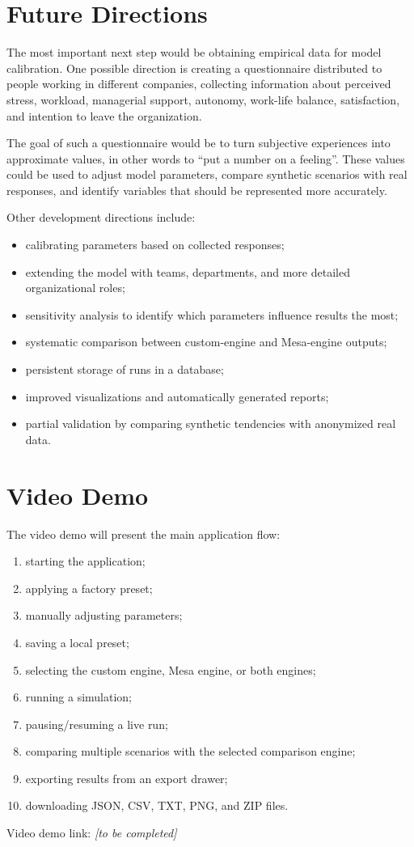 \documentclass[12pt,a4paper]{article}
\begin{document}
\section{Future Directions}

The most important next step would be obtaining empirical data for model calibration. One possible direction is creating a questionnaire distributed to people working in different companies, collecting information about perceived stress, workload, managerial support, autonomy, work-life balance, satisfaction, and intention to leave the organization.

The goal of such a questionnaire would be to turn subjective experiences into approximate values, in other words to ``put a number on a feeling''. These values could be used to adjust model parameters, compare synthetic scenarios with real responses, and identify variables that should be represented more accurately.

Other development directions include:

\begin{itemize}
    \item calibrating parameters based on collected responses;
    \item extending the model with teams, departments, and more detailed organizational roles;
    \item sensitivity analysis to identify which parameters influence results the most;
    \item systematic comparison between custom-engine and Mesa-engine outputs;
    \item persistent storage of runs in a database;
    \item improved visualizations and automatically generated reports;
    \item partial validation by comparing synthetic tendencies with anonymized real data.
\end{itemize}

\section{Video Demo}

The video demo will present the main application flow:

\begin{enumerate}
    \item starting the application;
    \item applying a factory preset;
    \item manually adjusting parameters;
    \item saving a local preset;
    \item selecting the custom engine, Mesa engine, or both engines;
    \item running a simulation;
    \item pausing/resuming a live run;
    \item comparing multiple scenarios with the selected comparison engine;
    \item exporting results from an export drawer;
    \item downloading JSON, CSV, TXT, PNG, and ZIP files.
\end{enumerate}

Video demo link: \textit{[to be completed]}
\end{document}
